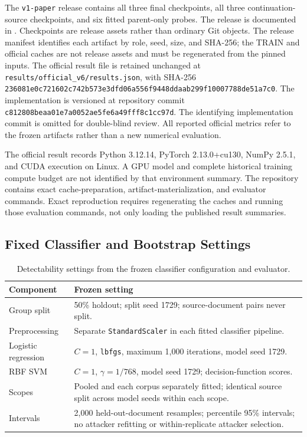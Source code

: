 \documentclass[10pt]{article}
\begin{document}
The \texttt{v1-paper} release contains all three final checkpoints, all three
continuation-source checkpoints, and six fitted parent-only probes.
\ifdefined\papreprint
The release is documented in \citep{stoica-2026-recursive-geodesic}.
\fi
Checkpoints are release assets rather than ordinary Git objects.
The release manifest identifies each artifact by
role, seed, size, and SHA-256; the TRAIN and official caches are not release
assets and must be regenerated from the pinned inputs. The official result
file is retained unchanged at \texttt{results/official\_v6/results.json}, with
SHA-256 \nolinkurl{236081e0c721602c742b573e3dfd06a556f9448ddaab299f10007788de51a7c0}.
\ifdefined\papreprint
The implementation is versioned at repository commit
\nolinkurl{c812808beaa01e7a0052ae5fe6a49fff8c1cc97d}.
\else
The identifying implementation commit is omitted for double-blind review.
\fi
All reported official metrics refer to the frozen artifacts rather than a
new numerical evaluation.

The official result records Python 3.12.14, PyTorch 2.13.0+cu130, NumPy 2.5.1,
and CUDA execution on Linux. A GPU model and complete historical training
compute budget are not identified by that environment summary. The repository
contains exact cache-preparation, artifact-materialization, and evaluator
commands. Exact reproduction requires regenerating the caches and running
those evaluation commands, not only loading the published result summaries.

\subsection{Fixed Classifier and Bootstrap Settings}
\label{app:attack-settings}

\begin{table}[H]
\caption{Detectability settings from the frozen classifier configuration and evaluator.}
\label{tab:attack-settings}
\centering\small
\begin{tabularx}{\linewidth}{l Y}
\toprule
\textbf{Component} & \textbf{Frozen setting}\\
\midrule
Group split & 50\% holdout; split seed 1729; source-document pairs never split.\\
Preprocessing & Separate \texttt{StandardScaler} in each fitted classifier pipeline.\\
Logistic regression & \(C=1\), \texttt{lbfgs}, maximum 1,000 iterations, model seed 1729.\\
RBF SVM & \(C=1\), \(\gamma=1/768\), model seed 1729; decision-function scores.\\
Scopes & Pooled and each corpus separately fitted; identical source split across model seeds within each scope.\\
Intervals & 2,000 held-out-document resamples; percentile 95\% intervals; no attacker refitting or within-replicate attacker selection.\\
\bottomrule
\end{tabularx}
\end{table}
\end{document}
